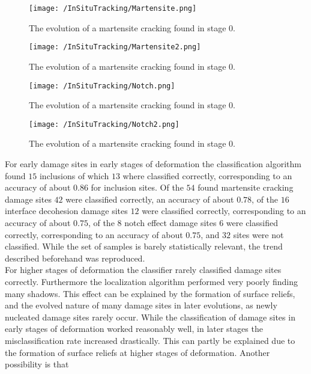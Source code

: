 \begin{figure}
\texttt{[image: /InSituTracking/Martensite.png]}
\caption{The evolution of a martensite cracking found in stage 0.}
\label{fig:MCEV1}
\end{figure}

\begin{figure}
\texttt{[image: /InSituTracking/Martensite2.png]}
\caption{The evolution of a martensite cracking found in stage 0.}
\label{fig:MCEV2}
\end{figure}



\begin{figure}
\texttt{[image: /InSituTracking/Notch.png]}
\caption{The evolution of a martensite cracking found in stage 0.}
\label{fig:NEEV1}
\end{figure}

\begin{figure}
\texttt{[image: /InSituTracking/Notch2.png]}
\caption{The evolution of a martensite cracking found in stage 0.}
\label{fig:NEEV2}
\end{figure}



For early damage sites in early stages of deformation the classification algorithm found $15$ inclusions of which $13$ where classified correctly, corresponding to an accuracy of about $0.86$ for inclusion sites. Of the $54$ found martensite cracking damage sites $42$ were classified correctly, an accuracy of about $0.78$, of the $16$ interface decohesion damage sites $12$ were classified correctly, corresponding to an accuracy of about $0.75$, of the $8$ notch effect damage sites $6$ were classified correctly, corresponding to an accuracy of about $0.75$, and $32$ sites were not classified. While the set of samples is barely statistically relevant, the trend described beforehand was reproduced. \\

For higher stages of deformation the classifier rarely classified damage sites correctly. Furthermore the localization algorithm performed very poorly finding many shadows. This effect can be explained by the formation of surface reliefs, and the evolved nature of many damage sites in later evolutions, as newly nucleated damage sites rarely occur. 
While the classification of damage sites in early stages of deformation worked reasonably well, in later stages the misclassification rate increased drastically. This can partly be explained due to the formation of surface reliefs at higher stages of deformation. Another possibility is that 

